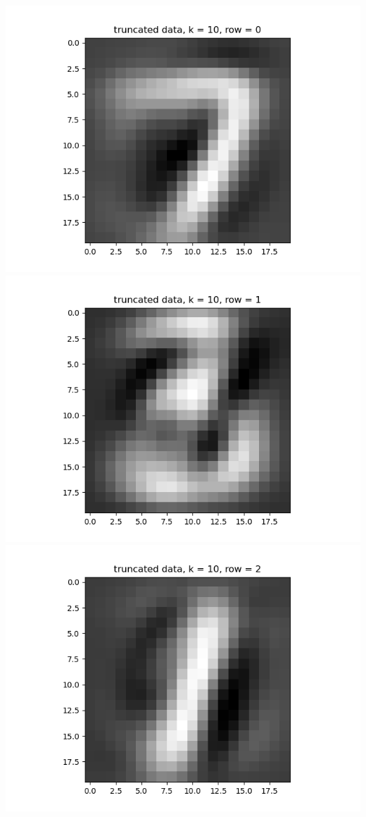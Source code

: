 \documentclass{article}
\begin{document}
\begin{enumerate}
\begin{enumerate}
\begin{center}
			\includegraphics[scale=.4]{hw3 trunc, k = 10, row = 0}
			\includegraphics[scale=.4]{hw3 trunc, k = 10, row = 1}
			\includegraphics[scale=.4]{hw3 trunc, k = 10, row = 2}

\end{center}
\end{enumerate}
\end{enumerate}
\end{document}
